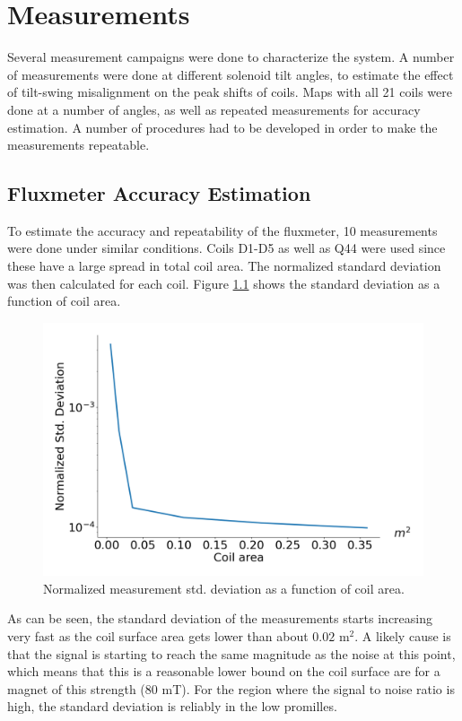 \chapter{Measurements}
Several measurement campaigns were done to characterize the system.
A number of measurements were done at different solenoid tilt
angles, to estimate the effect of tilt-swing misalignment on 
the peak shifts of coils. Maps with all 21 coils
were done at a number of angles, as well as repeated measurements
for accuracy estimation. A number of procedures had to be developed
in order to make the measurements repeatable. 

\section{Fluxmeter Accuracy Estimation}
To estimate the accuracy and repeatability of the fluxmeter, 10
measurements were done under similar conditions. Coils D1-D5 as
well as Q44 were used since these have a large spread in total coil area.
The normalized standard deviation was then calculated for each coil.
Figure \ref{fig:coilarea} shows the standard deviation as a function 
of coil area.

\begin{figure}[!h]
    \centering
    \includegraphics[width=0.8\linewidth]{figs/coilarea-error}
    \caption{Normalized measurement std. deviation as a function of
    coil area.}
    \label{fig:coilarea}
\end{figure}

As can be seen, the standard deviation of the measurements starts
increasing very fast as the coil surface area gets lower than
about $0.02$ $\text{m}^2$. A likely cause is that the signal
is starting to reach the same magnitude as the noise at this
point, which means that this is a reasonable lower bound 
on the coil surface are for a magnet of this strength ($80$ mT). 
For the region where the signal to noise ratio is high, the
standard deviation is reliably in the low promilles.

